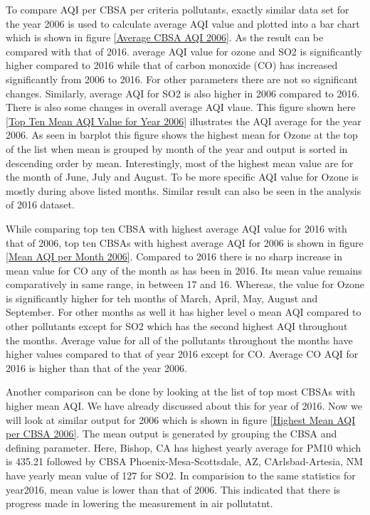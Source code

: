 \documentclass[sigconf]{acmart}
\begin{document}
   To compare AQI per CBSA per criteria pollutants, exactly similar data set for the year 2006 is used to calculate average AQI value and plotted into a bar chart which is shown in figure \ref{Average CBSA AQI 2006}. As the result can be compared with that of 2016.
   average AQI  value for ozone and SO2 is significantly higher compared to 2016 while that of carbon monoxide (CO) has increased significantly from 2006 to 2016. For other parameters there are not so significant changes. Similarly, average AQI for SO2 is also higher in 2006 compared to 2016. 
   There is also some changes in overall average AQI vlaue. This figure shown here \ref{Top Ten Mean AQI Value for Year 2006} illustrates the AQI average for the year 2006. As seen in barplot this figure shows the highest mean for Ozone at the top of the list when mean is grouped by month of the year and output is sorted in descending order by mean. Interestingly, most of the highest mean value are for the month of June, July and August. To be more specific AQI value for Ozone is mostly during above listed months. Similar result can also be seen in the  analysis of 2016 dataset.

   While comparing top ten CBSA with highest average AQI value for 2016 with that of 2006, top ten CBSAs with highest average AQI for 2006 is shown in figure \ref{Mean AQI per Month 2006}. Compared to 2016 there is no sharp increase in mean value for CO any of the month as has been in 2016. Its mean value remains comparatively in same range, in between 17 and 16. Whereas, the value for Ozone is significantly higher for teh months of March, April, May, August and September. For other months as well it has higher level o mean AQI compared to other pollutants except for SO2 which has the second highest AQI throughout the months. Average value for all of the pollutants throughout the months have higher values compared to that of year 2016 except for CO. Average CO AQI for 2016 is higher than that of the year 2006. 

   Another comparison can be done by looking at the list of top most CBSAs with higher mean AQI. We have already discussed about this for year of 2016.  Now we will look at similar output for 2006 which is shown in figure \ref{Highest Mean AQI per CBSA 2006}. The mean output is generated by grouping the CBSA and defining parameter. Here, Bishop, CA has highest yearly average for PM10 which is 435.21 followed by CBSA Phoenix-Mesa-Scottsdale, AZ, CArlsbad-Artesia, NM have yearly mean value of 127 for SO2. In comparision to the same statistics for year2016,  mean value is lower than that of 2006. This indicated that there is progress made in lowering the measurement in air pollutatnt.
\end{document}
